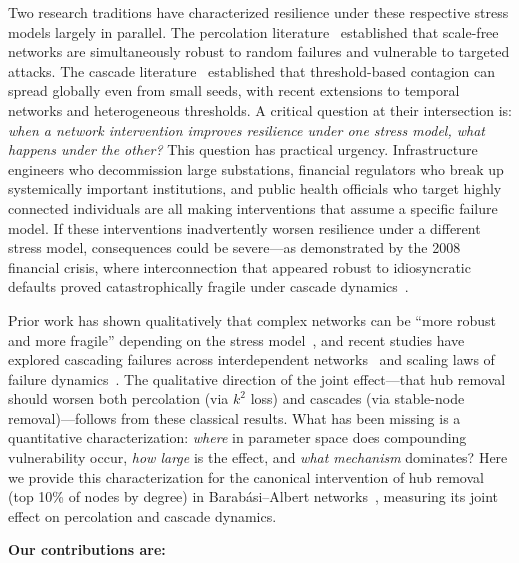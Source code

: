 \documentclass[aps,pre,twocolumn,superscriptaddress,showpacs]{revtex4-2}
\begin{document}
Two research traditions have characterized resilience under these respective stress models largely in parallel. The percolation literature~\cite{Barabasi1999,Albert2000,Cohen2000,Cohen2001,Geng2021} established that scale-free networks are simultaneously robust to random failures and vulnerable to targeted attacks. The cascade literature~\cite{Watts2002,Gleeson2007,Dodds2004,Nishioka2022,Karimi2021} established that threshold-based contagion can spread globally even from small seeds, with recent extensions to temporal networks and heterogeneous thresholds. A critical question at their intersection is: \emph{when a network intervention improves resilience under one stress model, what happens under the other?} This question has practical urgency. Infrastructure engineers who decommission large substations, financial regulators who break up systemically important institutions, and public health officials who target highly connected individuals are all making interventions that assume a specific failure model. If these interventions inadvertently worsen resilience under a different stress model, consequences could be severe---as demonstrated by the 2008 financial crisis, where interconnection that appeared robust to idiosyncratic defaults proved catastrophically fragile under cascade dynamics~\cite{Battiston2012}.

Prior work has shown qualitatively that complex networks can be ``more robust and more fragile'' depending on the stress model~\cite{Albert2000,Callaway2000}, and recent studies have explored cascading failures across interdependent networks~\cite{Valdez2020,Xu2021} and scaling laws of failure dynamics~\cite{Pal2023}. The qualitative direction of the joint effect---that hub removal should worsen both percolation (via $k^2$ loss) and cascades (via stable-node removal)---follows from these classical results. What has been missing is a quantitative characterization: \emph{where} in parameter space does compounding vulnerability occur, \emph{how large} is the effect, and \emph{what mechanism} dominates? Here we provide this characterization for the canonical intervention of hub removal (top 10\% of nodes by degree) in Barab\'asi--Albert networks~\cite{Barabasi1999}, measuring its joint effect on percolation and cascade dynamics.

\textbf{Our contributions are:}
\end{document}
